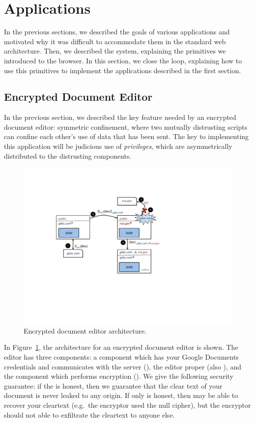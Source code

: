 \section{Applications}
\label{sec:apps}

In the previous sections, we described the goals of various applications
and motivated why it was difficult to accommodate them in the standard
web architecture.  Then, we described the \sys{} system, explaining the
primitives we introduced to the browser.  In this section, we close the
loop, explaining how to use this primitives to implement the
applications described in the first section.

\subsection{Encrypted Document Editor}

In the previous section, we described the key feature needed by an
encrypted document editor: symmetric confinement, where two mutually
distrusting scripts can confine each other's use of data that has been
sent.  The key to implementing this application will be judicious use of
\emph{privileges}, which are asymmetrically distributed to the
distrusting components.

\begin{figure}
\centerline{\includegraphics[width=\columnwidth]{editor}}
\caption{\label{fig:editor} Encrypted document editor architecture.}
\end{figure}

In Figure~\ref{fig:editor}, the architecture for an encrypted document
editor is shown.  The editor has three components: a component which has
your Google Documents credentials and communicates with the server (), the
editor proper (also ), and the component which performs encryption ().  We give the
following security guarantee: if the  is honest, then we
guarantee that the clear text of your document is never leaked to any
origin.  If only  is honest, then  may
be able to recover your cleartext (e.g.\ the encryptor used the null
cipher), but the encryptor should not able to exfiltrate the cleartext
to anyone else.

